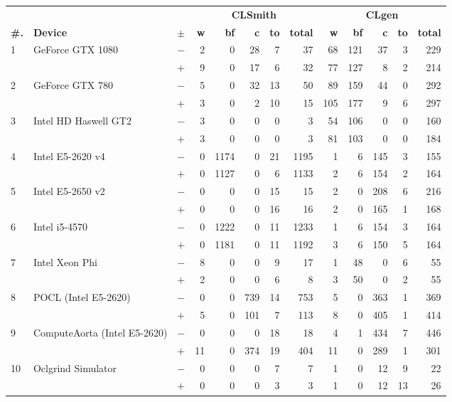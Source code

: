   \begin{tabular}{lll | rrrrr | rrrrr }
  \toprule
  & & & \multicolumn{5}{c|}{\textbf{CLSmith}} & \multicolumn{5}{c}{\textbf{CLgen}} \\
  \textbf{\#.} & \textbf{Device} & $\pm$ &
  \textbf{w} & \textbf{bf} & \textbf{c} & \textbf{to} & \textbf{total} &
  \textbf{w} & \textbf{bf} & \textbf{c} & \textbf{to} & \textbf{total} \\
  \midrule
  \multirow{ 2}{*}{1} & \multirow{ 2}{*}{GeForce GTX 1080} & $-$ & 2 & 0 & 28 & 7 & 37       & 68 & 121 & 37 & 3 & 229 \\& & $+$ & 9 & 0 & 17 & 6 & 32 & 77 & 127 & 8 & 2 & 214 \\
\hline
\multirow{ 2}{*}{2} & \multirow{ 2}{*}{GeForce GTX 780} & $-$ & 5 & 0 & 32 & 13 & 50       & 89 & 159 & 44 & 0 & 292 \\& & $+$ & 3 & 0 & 2 & 10 & 15 & 105 & 177 & 9 & 6 & 297 \\
\hline
\multirow{ 2}{*}{3} & \multirow{ 2}{*}{Intel HD Haswell GT2} & $-$ & 3 & 0 & 0 & 0 & 3       & 54 & 106 & 0 & 0 & 160 \\& & $+$ & 3 & 0 & 0 & 0 & 3 & 81 & 103 & 0 & 0 & 184 \\
\hline
\multirow{ 2}{*}{4} & \multirow{ 2}{*}{Intel E5-2620 v4} & $-$ & 0 & 1174 & 0 & 21 & 1195       & 1 & 6 & 145 & 3 & 155 \\& & $+$ & 0 & 1127 & 0 & 6 & 1133 & 2 & 6 & 154 & 2 & 164 \\
\hline
\multirow{ 2}{*}{5} & \multirow{ 2}{*}{Intel E5-2650 v2} & $-$ & 0 & 0 & 0 & 15 & 15       & 2 & 0 & 208 & 6 & 216 \\& & $+$ & 0 & 0 & 0 & 16 & 16 & 2 & 0 & 165 & 1 & 168 \\
\hline
\multirow{ 2}{*}{6} & \multirow{ 2}{*}{Intel i5-4570} & $-$ & 0 & 1222 & 0 & 11 & 1233       & 1 & 6 & 154 & 3 & 164 \\& & $+$ & 0 & 1181 & 0 & 11 & 1192 & 3 & 6 & 150 & 5 & 164 \\
\hline
\multirow{ 2}{*}{7} & \multirow{ 2}{*}{Intel Xeon Phi} & $-$ & 8 & 0 & 0 & 9 & 17       & 1 & 48 & 0 & 6 & 55 \\& & $+$ & 2 & 0 & 0 & 6 & 8 & 3 & 50 & 0 & 2 & 55 \\
\hline
\multirow{ 2}{*}{8} & \multirow{ 2}{*}{POCL (Intel E5-2620)} & $-$ & 0 & 0 & 739 & 14 & 753       & 5 & 0 & 363 & 1 & 369 \\& & $+$ & 5 & 0 & 101 & 7 & 113 & 8 & 0 & 405 & 1 & 414 \\
\hline
\multirow{ 2}{*}{9} & \multirow{ 2}{*}{ComputeAorta (Intel E5-2620)} & $-$ & 0 & 0 & 0 & 18 & 18       & 4 & 1 & 434 & 7 & 446 \\& & $+$ & 11 & 0 & 374 & 19 & 404 & 11 & 0 & 289 & 1 & 301 \\
\hline
\multirow{ 2}{*}{10} & \multirow{ 2}{*}{Oclgrind Simulator} & $-$ & 0 & 0 & 0 & 7 & 7       & 1 & 0 & 12 & 9 & 22 \\& & $+$ & 0 & 0 & 0 & 3 & 3 & 1 & 0 & 12 & 13 & 26 \\
  \bottomrule
\end{tabular}

